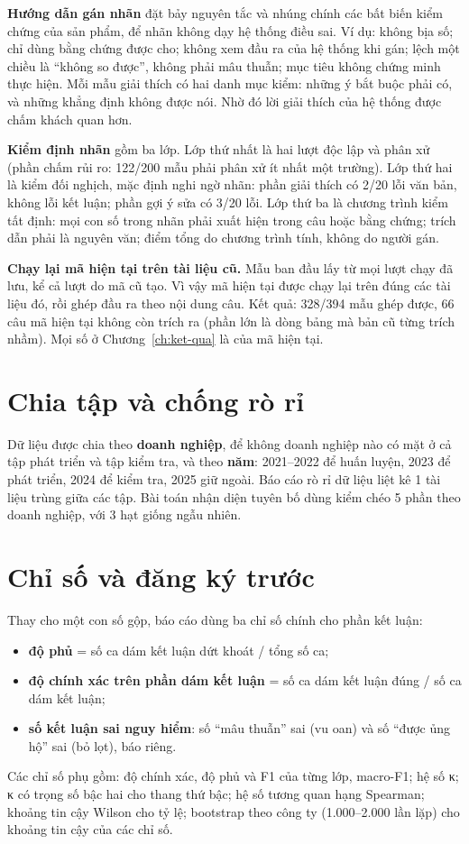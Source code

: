\textbf{Hướng dẫn gán nhãn} đặt bảy nguyên tắc và nhúng chính các bất biến kiểm chứng của sản phẩm, để nhãn không dạy hệ thống điều sai. Ví dụ: không bịa số; chỉ dùng bằng chứng được cho; không xem đầu ra của hệ thống khi gán; lệch một chiều là “không so được”, không phải mâu thuẫn; mục tiêu không chứng minh thực hiện. Mỗi mẫu giải thích có hai danh mục kiểm: những ý bắt buộc phải có, và những khẳng định không được nói. Nhờ đó lời giải thích của hệ thống được chấm khách quan hơn.

\textbf{Kiểm định nhãn} gồm ba lớp. Lớp thứ nhất là hai lượt độc lập và phân xử (phần chấm rủi ro: 122/200 mẫu phải phân xử ít nhất một trường). Lớp thứ hai là kiểm đối nghịch, mặc định nghi ngờ nhãn: phần giải thích có 2/20 lỗi văn bản, không lỗi kết luận; phần gợi ý sửa có 3/20 lỗi. Lớp thứ ba là chương trình kiểm tất định: mọi con số trong nhãn phải xuất hiện trong câu hoặc bằng chứng; trích dẫn phải là nguyên văn; điểm tổng do chương trình tính, không do người gán.

\textbf{Chạy lại mã hiện tại trên tài liệu cũ.} Mẫu ban đầu lấy từ mọi lượt chạy đã lưu, kể cả lượt do mã cũ tạo. Vì vậy mã hiện tại được chạy lại trên đúng các tài liệu đó, rồi ghép đầu ra theo nội dung câu. Kết quả: 328/394 mẫu ghép được, 66 câu mã hiện tại không còn trích ra (phần lớn là dòng bảng mà bản cũ từng trích nhầm). Mọi số ở Chương~\ref{ch:ket-qua} là của mã hiện tại.

\section{Chia tập và chống rò rỉ}

Dữ liệu được chia theo \textbf{doanh nghiệp}, để không doanh nghiệp nào có mặt ở cả tập phát triển và tập kiểm tra, và theo \textbf{năm}: 2021–2022 để huấn luyện, 2023 để phát triển, 2024 để kiểm tra, 2025 giữ ngoài. Báo cáo rò rỉ dữ liệu liệt kê 1 tài liệu trùng giữa các tập. Bài toán nhận diện tuyên bố dùng kiểm chéo 5 phần theo doanh nghiệp, với 3 hạt giống ngẫu nhiên.

\section{Chỉ số và đăng ký trước}\label{sec:chi-so}

Thay cho một con số gộp, báo cáo dùng ba chỉ số chính cho phần kết luận:
\begin{itemize}
\item \textbf{độ phủ} = số ca dám kết luận dứt khoát / tổng số ca;
\item \textbf{độ chính xác trên phần dám kết luận} = số ca dám kết luận đúng / số ca dám kết luận;
\item \textbf{số kết luận sai nguy hiểm}: số “mâu thuẫn” sai (vu oan) và số “được ủng hộ” sai (bỏ lọt), báo riêng.
\end{itemize}
Các chỉ số phụ gồm: độ chính xác, độ phủ và F1 của từng lớp, macro-F1; hệ số κ; κ có trọng số bậc hai cho thang thứ bậc; hệ số tương quan hạng Spearman; khoảng tin cậy Wilson cho tỷ lệ; bootstrap theo công ty (1.000–2.000 lần lặp) cho khoảng tin cậy của các chỉ số.

